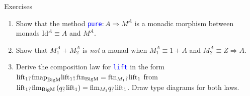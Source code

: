 \documentclass[english]{beamer}
\newcommand{\bef}{\ensuremath\raisebox{2pt}{$\mathsmaller{\mathsmaller{\circ}}$}\hspace{-3.3pt},}
\begin{document}
\begin{frame}{Exercises}
\begin{enumerate}
\item {\small{}Show that the method }\texttt{\textcolor{blue}{\footnotesize{}pure}}{\small{}$:A\Rightarrow M^{A}$
is a monadic morphism between monads $\text{Id}^{A}\equiv A$ and
$M^{A}$.}{\small\par}
\item {\small{}Show that $M_{1}^{A}+M_{2}^{A}$ is }\emph{\small{}not}{\small{}
a monad when $M_{1}^{A}\equiv1+A$ and $M_{2}^{A}\equiv Z\Rightarrow A$.}{\small\par}
\item Derive the composition law for \texttt{\textcolor{blue}{\footnotesize{}lift}}
in the form {\footnotesize{}$\text{lift}_{1}\bef\text{fmap}_{\text{BigM}}\text{lift}_{1}\bef\text{ftn}_{\text{BigM}}=\text{ftn}_{M_{1}}\bef\text{lift}_{1}$}
from {\footnotesize{}$\text{lift}_{1}\bef\text{flm}_{\text{BigM}}\left(q\bef\text{lift}_{1}\right)=\text{flm}_{M_{1}}q\bef\text{lift}_{1}$}.
Draw type diagrams for both laws.
\end{enumerate}
\end{frame}
\end{document}
